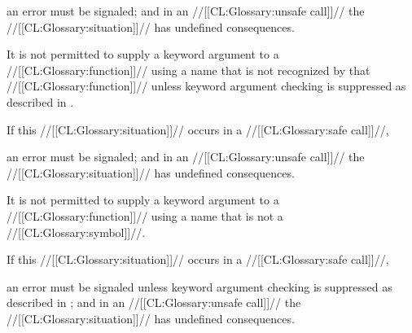 an error  must be signaled;
and in an //[[CL:Glossary:unsafe call]]// the //[[CL:Glossary:situation]]// has undefined consequences.








\endsubsubsection%


It is not permitted to supply a keyword argument to a //[[CL:Glossary:function]]//
using a name that is not recognized by that //[[CL:Glossary:function]]// 
unless keyword argument checking is suppressed as described
in \secref\SuppressingKeyArgChecks.



If this //[[CL:Glossary:situation]]// occurs in a //[[CL:Glossary:safe call]]//,

an error  must be signaled;
and in an //[[CL:Glossary:unsafe call]]// the //[[CL:Glossary:situation]]// has undefined consequences.








\endsubsubsection%


It is not permitted to supply a keyword argument to a //[[CL:Glossary:function]]//
using a name that is not a //[[CL:Glossary:symbol]]//.



If this //[[CL:Glossary:situation]]// occurs in a //[[CL:Glossary:safe call]]//,

an error  must be signaled 
unless keyword argument checking is suppressed as described
in \secref\SuppressingKeyArgChecks;
and in an //[[CL:Glossary:unsafe call]]// the //[[CL:Glossary:situation]]// has undefined consequences.








